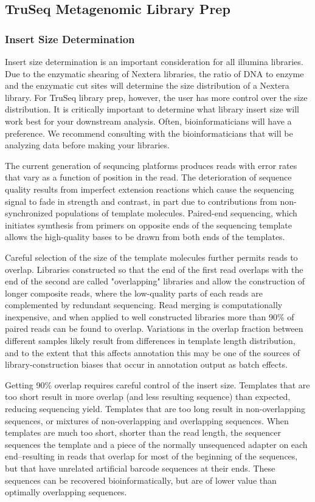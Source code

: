 \documentclass[graybox]{svmult}
\begin{document}
\subsection{TruSeq Metagenomic Library Prep}
\subsubsection{ Insert Size Determination}

Insert size determination is an important consideration for all illumina libraries.  Due to the enzymatic shearing of Nextera libraries, the ratio of DNA to enzyme and the enzymatic cut sites will determine the size distribution of a Nextera library.  For TruSeq library prep, however, the user has more control over the size distribution.  It is critically important to determine what library insert size will work best for your downstream analysis. Often, bioinformaticians will have a preference. We recommend consulting with the bioinformaticians that will be analyzing data before making your libraries. 

        The current generation of sequncing platforms produces reads with error rates that vary as a function of position in the read.  The deterioration of sequence quality results from imperfect extension reactions which cause the sequencing signal to fade in strength and contrast, in part due to contributions from non-synchronized populations of template molecules.  Paired-end sequencing, which initiates symthesis from primers on opposite ends of the sequencing template allows the high-quality bases to be drawn from both ends of the templates.  

Careful selection of the size of the template molecules further permits reads to overlap.  Libraries constructed so that the end of the first read overlaps with the end of the second are called "overlapping" libraries and allow the construction of longer composite reads, where the low-quality parts of each reads are complemented by redundant sequencing.  Read merging is computationally inexpensive, and when applied to well constructed libraries more than 90\% of paired reads can be found to overlap.  Variations in the overlap fraction between different samples likely result from differences in template length distribution, and to the extent that this affects annotation this may be one of the sources of library-construction biases that occur in annotation output as batch effects.
        
Getting 90\% overlap requires careful control of the insert size.  Templates that are too short result in more overlap (and less resulting sequence) than expected, reducing sequencing yield.  Templates that are too long result in non-overlapping sequences, or mixtures of non-overlapping and overlapping sequences.   When templates are much too short, shorter than the read length, the sequencer sequences the template and a piece of the normally unsequenced adapter on each end--resulting in reads that overlap for most of the beginning of the sequences, but that have unrelated artificial barcode sequences at their ends.   These sequences can be recovered bioinformatically, but are of lower value than optimally overlapping sequences.
\end{document}
